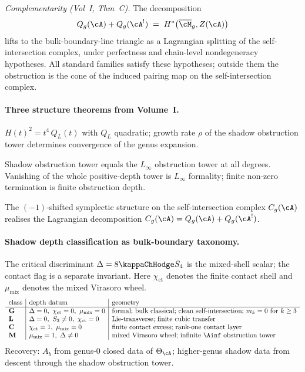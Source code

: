 \emph{Complementarity (Vol~I, Thm~C).} The decomposition
\[
 Q_g(\cA) + Q_g(\cA^!)
 \;=\;
 H^*\bigl(\overline{\cM}_g, Z(\cA)\bigr)
\]
lifts to the bulk-boundary-line triangle as a Lagrangian
splitting of the self-intersection complex, under perfectness
and chain-level nondegeneracy hypotheses. All standard families
satisfy these hypotheses; outside them the obstruction is the cone
of the induced pairing map on the self-intersection complex.

\paragraph{Three structure theorems from Volume~I.}
\begin{description}[leftmargin=1.6em,itemsep=2pt,topsep=1pt]
 \item[Algebraicity (Riccati).]
 $H(t)^2 = t^4\, Q_L(t)$ with $Q_L$ quadratic; growth rate
 $\rho$ of the shadow obstruction tower determines convergence
 of the genus expansion.
 \item[Obstruction-depth identification.]
 Shadow obstruction tower equals the $L_\infty$ obstruction tower
 at all degrees. Vanishing of the whole positive-depth tower is
 $L_\infty$ formality; finite non-zero termination is finite
 obstruction depth.
 \item[Complementarity holomorphic-topological split.]
 The $(-1)$-shifted symplectic structure on the
 self-intersection complex $C_g(\cA)$ realises the Lagrangian
 decomposition $C_g(\cA) = Q_g(\cA) + Q_g(\cA^!)$.
\end{description}

\paragraph{Shadow depth classification as bulk-boundary
taxonomy.}
The critical discriminant
$\Delta = 8\kappaChHodge S_4$ is the mixed-shell scalar; the
contact flag is a separate invariant.  Here
$\chi_{\mathrm{ct}}$ denotes the finite contact shell and
$\mu_{\mathrm{mix}}$ denotes the mixed Virasoro wheel.
\[
 \begin{array}{l|l|l}
 \text{class} & \text{depth datum} & \text{geometry} \\
 \hline
 \mathbf{G} & \Delta = 0,\ \chi_{\mathrm{ct}}=0,\ \mu_{\mathrm{mix}}=0
 & \text{formal; bulk classical; clean self-intersection; $m_k = 0$ for $k \ge 3$} \\
 \mathbf{L} & \Delta = 0,\ S_3\ne0,\ \chi_{\mathrm{ct}}=0
 & \text{Lie-transverse; finite cubic transfer} \\
 \mathbf{C} & \chi_{\mathrm{ct}}=1,\ \mu_{\mathrm{mix}}=0
 & \text{finite contact excess; rank-one contact layer} \\
 \mathbf{M} & \mu_{\mathrm{mix}}=1,\ \Delta\ne0
 & \text{mixed Virasoro wheel; infinite $\Ainf$ obstruction tower}
 \end{array}
\]
Recovery: $A_b$ from genus-$0$ closed data of $\Theta_\cA$;
higher-genus shadow data from descent through the shadow
obstruction tower.

